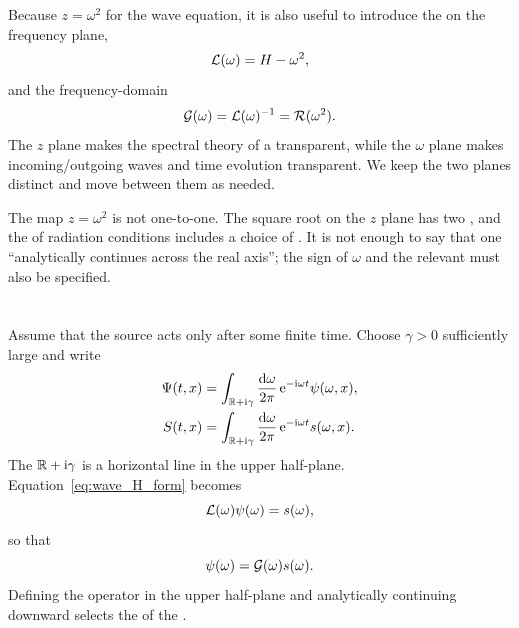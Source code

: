 Because $z=\omega^2$ for the wave equation, it is also useful to introduce the  on the frequency plane,
\begin{equation}
\mathcal{L}(\omega)
=
H-\omega^2,
\label{eq:operator_pencil}
\end{equation}
and the frequency-domain 
\begin{equation}
\mathcal{G}(\omega)
=
\mathcal{L}(\omega)^{-1}
=
\mathcal{R}(\omega^2).
\label{eq:frequency_green_operator}
\end{equation}
The $z$ plane makes the spectral theory of a  transparent, while the $\omega$ plane makes incoming/outgoing waves and time evolution transparent. We keep the two planes distinct and move between them as needed.

\begin{warningbox}
The map $z=\omega^2$ is not one-to-one. The square root on the $z$ plane has two , and the  of radiation conditions includes a choice of . It is not enough to say that one ``analytically continues across the real axis''; the sign of $\omega$ and the relevant  must also be specified.
\end{warningbox}

\section{}

Assume that the source acts only after some finite time. Choose $\gamma>0$ sufficiently large and write
\begin{align}
\Psi(t,x)
&=
\int_{\mathbb{R}+\mathrm{i}\gamma}
\frac{\mathrm{d}\omega}{2\pi}
\,
\mathrm{e}^{-\mathrm{i}\omega t}
\psi(\omega,x),
\label{eq:inverse_laplace_psi}
\\
S(t,x)
&=
\int_{\mathbb{R}+\mathrm{i}\gamma}
\frac{\mathrm{d}\omega}{2\pi}
\,
\mathrm{e}^{-\mathrm{i}\omega t}
s(\omega,x).
\label{eq:inverse_laplace_source}
\end{align}
The  $\mathbb{R}+\mathrm{i}\gamma$ is a horizontal line in the upper half-plane. Equation~\eqref{eq:wave_H_form} becomes
\begin{equation}
\mathcal{L}(\omega)\psi(\omega)
=
s(\omega),
\end{equation}
so that
\begin{equation}
\psi(\omega)
=
\mathcal{G}(\omega)s(\omega).
\label{eq:frequency_response}
\end{equation}
Defining the operator in the upper half-plane and analytically continuing downward selects the  of the .

